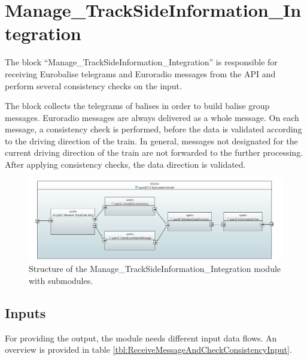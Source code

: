 
\section{Manage\_TrackSideInformation\_Integration}

The block ``Manage\_TrackSideInformation\_Integration'' is responsible for receiving Eurobalise telegrams and Euroradio messages from the API and perform several consistency checks on the input.

The block collects the telegrams of balises in order to build balise group messages. Euroradio messages are always delivered as a whole message. On each message, a consistency check is performed, before the data is validated according to the driving direction of the train. In general, messages not designated for the current driving direction of the train are not forwarded to the further processing. After applying consistency checks, the data direction is validated.


\begin{figure}
 \centering
 \includegraphics[width=\textwidth]{./images/Input-Messages4.PNG}
 \caption{Structure of the Manage\_TrackSideInformation\_Integration module with submodules.}
 \label{fig:receiveAndCheckConsistencyArch}
\end{figure}


\subsection{Inputs}
For providing the output, the module needs different input data flows. An overview is provided in table \ref{tbl:ReceiveMessageAndCheckConsistencyInput}.

